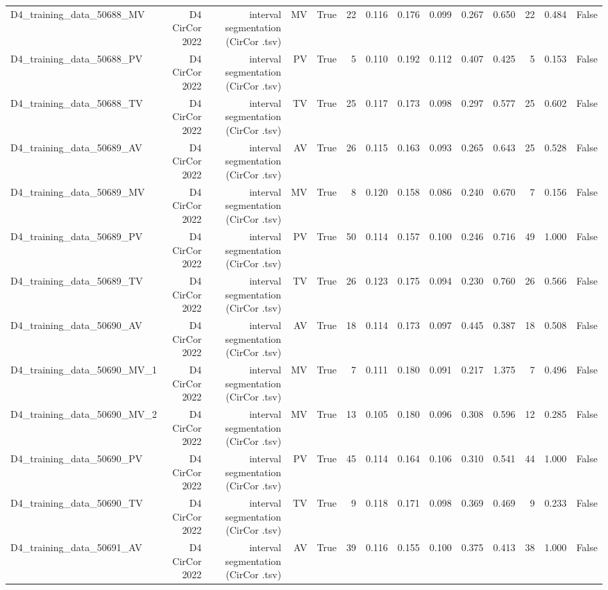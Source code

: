 \begin{table}[htbp]
\begin{tabular}{lrrrrrrrrrrrrr}
    D4\_training\_data\_50688\_MV & D4 CirCor 2022 & interval segmentation (CirCor .tsv) & MV & True & 22 & 0.116 & 0.176 & 0.099 & 0.267 & 0.650 & 22 & 0.484 & False \\
    D4\_training\_data\_50688\_PV & D4 CirCor 2022 & interval segmentation (CirCor .tsv) & PV & True & 5 & 0.110 & 0.192 & 0.112 & 0.407 & 0.425 & 5 & 0.153 & False \\
    D4\_training\_data\_50688\_TV & D4 CirCor 2022 & interval segmentation (CirCor .tsv) & TV & True & 25 & 0.117 & 0.173 & 0.098 & 0.297 & 0.577 & 25 & 0.602 & False \\
    D4\_training\_data\_50689\_AV & D4 CirCor 2022 & interval segmentation (CirCor .tsv) & AV & True & 26 & 0.115 & 0.163 & 0.093 & 0.265 & 0.643 & 25 & 0.528 & False \\
    D4\_training\_data\_50689\_MV & D4 CirCor 2022 & interval segmentation (CirCor .tsv) & MV & True & 8 & 0.120 & 0.158 & 0.086 & 0.240 & 0.670 & 7 & 0.156 & False \\
    D4\_training\_data\_50689\_PV & D4 CirCor 2022 & interval segmentation (CirCor .tsv) & PV & True & 50 & 0.114 & 0.157 & 0.100 & 0.246 & 0.716 & 49 & 1.000 & False \\
    D4\_training\_data\_50689\_TV & D4 CirCor 2022 & interval segmentation (CirCor .tsv) & TV & True & 26 & 0.123 & 0.175 & 0.094 & 0.230 & 0.760 & 26 & 0.566 & False \\
    D4\_training\_data\_50690\_AV & D4 CirCor 2022 & interval segmentation (CirCor .tsv) & AV & True & 18 & 0.114 & 0.173 & 0.097 & 0.445 & 0.387 & 18 & 0.508 & False \\
    D4\_training\_data\_50690\_MV\_1 & D4 CirCor 2022 & interval segmentation (CirCor .tsv) & MV & True & 7 & 0.111 & 0.180 & 0.091 & 0.217 & 1.375 & 7 & 0.496 & False \\
    D4\_training\_data\_50690\_MV\_2 & D4 CirCor 2022 & interval segmentation (CirCor .tsv) & MV & True & 13 & 0.105 & 0.180 & 0.096 & 0.308 & 0.596 & 12 & 0.285 & False \\
    D4\_training\_data\_50690\_PV & D4 CirCor 2022 & interval segmentation (CirCor .tsv) & PV & True & 45 & 0.114 & 0.164 & 0.106 & 0.310 & 0.541 & 44 & 1.000 & False \\
    D4\_training\_data\_50690\_TV & D4 CirCor 2022 & interval segmentation (CirCor .tsv) & TV & True & 9 & 0.118 & 0.171 & 0.098 & 0.369 & 0.469 & 9 & 0.233 & False \\
    D4\_training\_data\_50691\_AV & D4 CirCor 2022 & interval segmentation (CirCor .tsv) & AV & True & 39 & 0.116 & 0.155 & 0.100 & 0.375 & 0.413 & 38 & 1.000 & False \\

\end{tabular}
\end{table}
